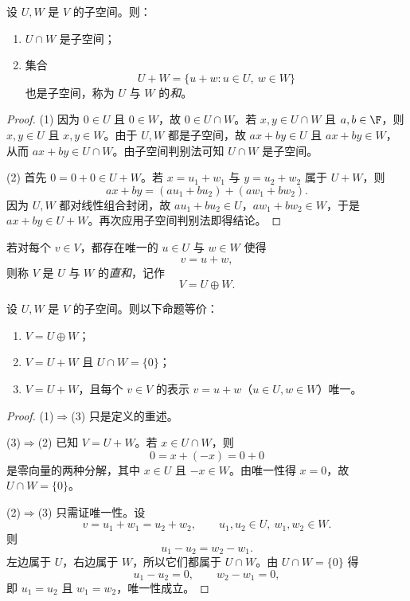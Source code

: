 \begin{proposition}
设 $U,W$ 是 $V$ 的子空间。则：
\begin{enumerate}[label=\textnormal{(\arabic*)}]
  \item $U\cap W$ 是子空间；
  \item 集合
  \[
  U+W=\{u+w:u\in U,\ w\in W\}
  \]
  也是子空间，称为 $U$ 与 $W$ 的\emph{和}。
\end{enumerate}
\end{proposition}

\begin{proof}
(1) 因为 $0\in U$ 且 $0\in W$，故 $0\in U\cap W$。若 $x,y\in U\cap W$ 且 $a,b\in\F$，则 $x,y\in U$ 且 $x,y\in W$。由于 $U,W$ 都是子空间，故 $ax+by\in U$ 且 $ax+by\in W$，从而 $ax+by\in U\cap W$。由子空间判别法可知 $U\cap W$ 是子空间。

(2) 首先 $0=0+0\in U+W$。若 $x=u_1+w_1$ 与 $y=u_2+w_2$ 属于 $U+W$，则
\[
ax+by=(au_1+bu_2)+(aw_1+bw_2).
\]
因为 $U,W$ 都对线性组合封闭，故 $au_1+bu_2\in U$，$aw_1+bw_2\in W$，于是 $ax+by\in U+W$。再次应用子空间判别法即得结论。
\end{proof}

\begin{definition}
若对每个 $v\in V$，都存在唯一的 $u\in U$ 与 $w\in W$ 使得
\[
v=u+w,
\]
则称 $V$ 是 $U$ 与 $W$ 的\emph{直和}，记作
\[
V=U\oplus W.
\]
\end{definition}

\begin{proposition}[直和的等价刻画]
设 $U,W$ 是 $V$ 的子空间。则以下命题等价：
\begin{enumerate}[label=\textnormal{(\arabic*)}]
  \item $V=U\oplus W$；
  \item $V=U+W$ 且 $U\cap W=\{0\}$；
  \item $V=U+W$，且每个 $v\in V$ 的表示 $v=u+w$（$u\in U,w\in W$）唯一。
\end{enumerate}
\end{proposition}

\begin{proof}
(1)$\Rightarrow$(3) 只是定义的重述。

(3)$\Rightarrow$(2) 已知 $V=U+W$。若 $x\in U\cap W$，则
\[
0=x+(-x)=0+0
\]
是零向量的两种分解，其中 $x\in U$ 且 $-x\in W$。由唯一性得 $x=0$，故 $U\cap W=\{0\}$。

(2)$\Rightarrow$(3) 只需证唯一性。设
\[
v=u_1+w_1=u_2+w_2,
\qquad u_1,u_2\in U,\ w_1,w_2\in W.
\]
则
\[
u_1-u_2=w_2-w_1.
\]
左边属于 $U$，右边属于 $W$，所以它们都属于 $U\cap W$。由 $U\cap W=\{0\}$ 得
\[
u_1-u_2=0,\qquad w_2-w_1=0,
\]
即 $u_1=u_2$ 且 $w_1=w_2$，唯一性成立。
\end{proof}

